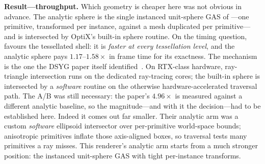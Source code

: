 \textbf{Result---throughput.} Which geometry is cheaper here was not obvious in advance. The analytic
sphere is the single instanced unit-sphere GAS of ---one primitive,
transformed per instance, against a mesh duplicated per primitive---and is intersected by
OptiX's built-in sphere routine. On the timing question,  favours the
tessellated shell: it is \emph{faster at every tessellation level}, and the analytic sphere pays $1.17$--$1.58\times$ in frame time for its exactness. The
mechanism is the one the DSYG paper itself identified~\cite{DSYG}. On RTX-class hardware,
ray-triangle intersection runs on the
dedicated ray-tracing cores; the built-in sphere is intersected by a \emph{software} routine on
the otherwise hardware-accelerated traversal path. The A/B was still necessary: the paper's
$4.96\times$ is measured against a different analytic baseline, so the magnitude---and with it
the decision---had to be established here. Indeed it comes out far smaller. Their analytic arm
was a custom \emph{software} ellipsoid intersector over per-primitive world-space bounds;
anisotropic primitives inflate those axis-aligned boxes, so traversal tests many primitives a
ray misses. This renderer's analytic arm starts from a much stronger position: the instanced
unit-sphere GAS with tight per-instance transforms.

